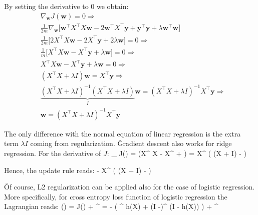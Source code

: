 By setting the derivative to 0 we obtain:
{\setlength{\jot}{10pt}
\begin{align*}
& \nabla_{\boldsymbol{w}} J(\boldsymbol{w}) = 0 \Rightarrow \\
& \frac{1}{2m} \nabla_{\boldsymbol{w}} \Big[ \boldsymbol{w}^{\intercal} X^{\intercal} X \boldsymbol{w} - 2
\boldsymbol{w}^{\intercal} X^{\intercal} \boldsymbol{y} + \boldsymbol{y}^{\intercal} \boldsymbol{y} + \lambda
\boldsymbol{w}^{\intercal} \boldsymbol{w} \Big] \\
& \frac{1}{2m} \Big[ 2 X^{\intercal} X \boldsymbol{w} - 2 X^{\intercal} \boldsymbol{y}
+ 2\lambda \boldsymbol{w} \Big] = 0 \Rightarrow \\
& \frac{1}{m} \Big[ X^{\intercal} X \boldsymbol{w} - X^{\intercal} \boldsymbol{y}
+ \lambda \boldsymbol{w} \Big] = 0 \Rightarrow \\
& X^{\intercal} X \boldsymbol{w} - X^{\intercal} \boldsymbol{y} + \lambda \boldsymbol{w} = 0 \Rightarrow \\
& (X^{\intercal} X + \lambda I) \boldsymbol{w} = X^{\intercal} \boldsymbol{y} \Rightarrow \\
& \underbrace{(X^{\intercal} X + \lambda I)^{-1} (X^{\intercal} X + \lambda I)}_{I} \boldsymbol{w}
= (X^{\intercal} X + \lambda I)^{-1} X^{\intercal} \boldsymbol{y} \Rightarrow \\
& \boldsymbol{w} = (X^{\intercal} X + \lambda I)^{-1} X^{\intercal} \boldsymbol{y}
\end{align*}}

\vspace{-10pt}

The only difference with the normal equation of linear regression is the extra term $\lambda I$ coming from
regularization. \v

Gradient descent also works for ridge regression. For the derivative of $J$:
\bse
\nabla_{} J() =  \Big(X^{\intercal} X 
- X^{\intercal}  + \lambda {} \Big) =  X^{\intercal}
\Big( (X + \lambda I)  -  \Big)
\ese

Hence, the update rule reads:
\bse
{} \coloneqq {} -  X^{\intercal}
\Big( (X + \lambda I)  -  \Big)
\ese

\v

Of course, L2 regularization can be applied also for the case of logistic regression. More specifically, for cross
entropy loss function of logistic regression the Lagrangian reads:
\bse
{} () = J() +  ^{\intercal} 
= -  \Big( ^{\intercal} \cdot \ln h(X) + (I -)^{\intercal}
\cdot \ln (I - h(X)) \Big) +  ^{\intercal} 
\ese

